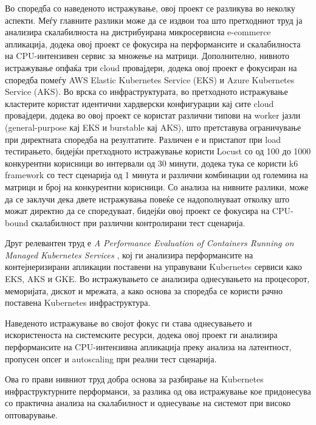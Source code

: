 \documentclass{article}
\begin{document}
Во споредба со наведеното истражување, овој проект се разликува во неколку аспекти. Меѓу главните разлики може да се издвои тоа што претходниот труд ја анализира скалабилноста на дистрибуирана микросервисна e-commerce апликација, додека овој проект се фокусира на перформансите и скалабилноста на CPU-интензивен сервис за множење на матрици. Дополнително, нивното истражување опфаќа три cloud провајдери, додека овој проект е фокусиран на споредба помеѓу AWS Elastic Kubernetes Service (EKS) и Azure Kubernetes Service (AKS). Во врска со инфраструктурата, во претходното истражување кластерите користат идентични хардверски конфигурации кај сите cloud провајдери, додека во овој проект се користат различни типови на worker јазли (general-purpose кај EKS и burstable кај AKS), што претставува ограничување при директната споредба на резултатите. Различен е и пристапот при load тестирањето, бидејќи претходното истражување користи Locust со од 100 до 1000 конкурентни корисници во интервали од 30 минути, додека тука се користи k6 framework со тест сценарија од 1 минута и различни комбинации од големина на матрици и број на конкурентни корисници. Со анализа на нивните разлики, може да се заклучи дека двете истражувања повеќе се надополнуваат отколку што можат директно да се споредуваат, бидејќи овој проект се фокусира на CPU-bound скалабилност при различни контролирани тест сценарија.

Друг релевантен труд е \textit{A Performance Evaluation of Containers Running on Managed Kubernetes Services} \cite{ferreira2019}, кој ги анализира перформансите на контејнеризирани апликации поставени на управувани Kubernetes сервиси како EKS, AKS и GKE. Во истражувањето се анализира однесувањето на процесорот, меморијата, дискот и мрежата, а како основа за споредба се користи рачно поставена Kubernetes инфраструктура.

Наведеното истражување во својот фокус ги става однесувањето и искористеноста на системските ресурси, додека овој проект ги анализира перформансите на CPU-интензивна апликација преку анализа на латентност, пропусен опсег и autoscaling при реални тест сценарија. 

Ова го прави нивниот труд добра основа за разбирање на Kubernetes инфраструктурните перформанси, за разлика од ова истражување кое придонесува со практична анализа на скалабилност и однесување на системот при високо оптоварување.
\end{document}
